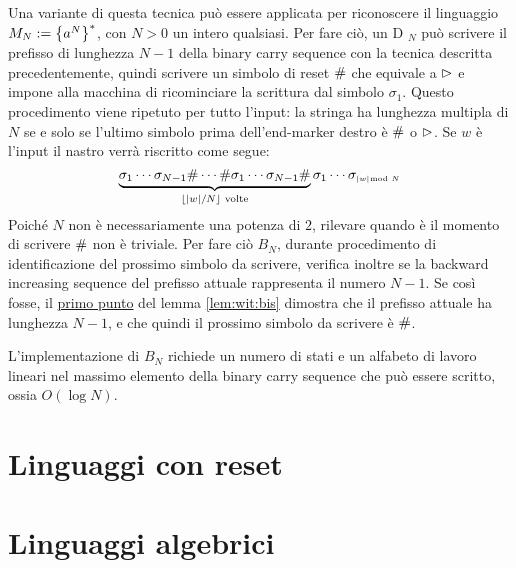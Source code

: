 Una variante di questa tecnica può essere applicata per riconoscere il linguaggio $M_N:=\left\{ a^N \right\}^*$, con $N>0$ un intero qualsiasi. Per fare ciò, un D $_N$ può scrivere il prefisso di lunghezza $N-1$ della binary carry sequence con la tecnica descritta precedentemente, quindi scrivere un simbolo di reset $\#$ che equivale a $\rhd$ e impone alla macchina di ricominciare la scrittura dal simbolo $\sigma_1$. Questo procedimento viene ripetuto per tutto l'input: la stringa ha lunghezza multipla di $N$ se e solo se l'ultimo simbolo prima dell'end-marker destro è $\#$ o $\rhd$. Se $w$ è l'input il nastro verrà riscritto come segue:
\begin{equation*}
	\underbrace{\sigma_1\cdots\sigma_{N-1}\#\cdots\#\sigma_1\cdots\sigma_{N-1}\#}_{\lfloor |w|/N \rfloor \text{ volte}}\sigma_1\cdots\sigma_{\scriptscriptstyle |w|\mkern -11mu \mod N}
\end{equation*}
Poiché $N$ non è necessariamente una potenza di $2$, rilevare quando è il momento di scrivere $\#$ non è triviale. Per fare ciò $B_N$, durante procedimento di identificazione del prossimo simbolo da scrivere, verifica inoltre se la backward increasing sequence del prefisso attuale rappresenta il numero $N-1$. Se così fosse, il \hyperref[lem:wit:bis:1]{primo punto} del lemma \ref{lem:wit:bis} dimostra che il prefisso attuale ha lunghezza $N-1$, e che quindi il prossimo simbolo da scrivere è $\#$.

L'implementazione di $B_N$ richiede un numero di stati e un alfabeto di lavoro lineari nel massimo elemento della binary carry sequence che può essere scritto, ossia $O(\log N)$.




\section{Linguaggi con reset}



\section{Linguaggi algebrici}
